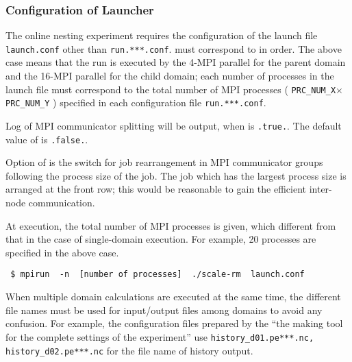 \subsubsection{Configuration of Launcher}
\label{subsubsec:launch}
The online nesting experiment requires the configuration of the launch file \verb|launch.conf|
other than \verb|run.***.conf|.
 must correspond to  in order.
The above case means that
the run is executed by
the 4-MPI parallel for the parent domain 
and the 16-MPI parallel for the child domain;
each number of processes in the launch file 
must correspond to the total number of MPI processes ( \verb|PRC_NUM_X|$\times$\verb|PRC_NUM_Y| )
specified in each configuration file \verb|run.***.conf|.

Log of MPI communicator splitting will be output, when  is \verb|.true.|.
The default value of  is \verb|.false.|.

Option of  is the switch for job rearrangement in MPI communicator groups following the process size of the job. The job which has the largest process size is arranged at the front row;
this would be reasonable to gain the efficient inter-node communication.

At execution, the total number of MPI processes is given, which different from that in the case of single-domain execution. For example, 20 processes are specified in the above case.
\begin{verbatim}
 $ mpirun  -n  [number of processes]  ./scale-rm  launch.conf
\end{verbatim}

When multiple domain calculations are executed at the same time,
the different file names must be used for input/output files
among domains to avoid any confusion.
For example, the configuration files prepared by the 
``the making tool for the complete settings of the experiment''
use \verb|history_d01.pe***.nc, history_d02.pe***.nc| for the file name of history output.

